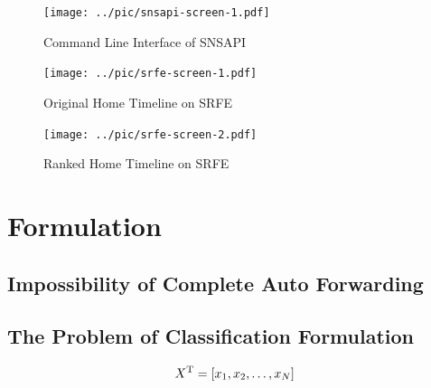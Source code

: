 \documentclass{sig-alternate}
\begin{document}
\begin{figure}[t!]
	\centering
	\texttt{[image: ../pic/snsapi-screen-1.pdf]}
	\caption{Command Line Interface of SNSAPI}
	\label{fig:snscli}
\end{figure}

\begin{figure}[t!]
	\centering
	\texttt{[image: ../pic/srfe-screen-1.pdf]}
	\caption{Original Home Timeline on SRFE}
\end{figure}

\begin{figure}[t!]
	\centering
	\texttt{[image: ../pic/srfe-screen-2.pdf]}
	\caption{Ranked Home Timeline on SRFE}
\end{figure}

%
%
%


\section{Formulation}
\label{sec:Formulation}

\subsection{Impossibility of Complete Auto Forwarding}
\label{sec:Impossibility of Complete Auto Forwarding}

\subsection{The Problem of Classification Formulation}
\label{sec:The Problem of Classification}

\begin{equation}
	X^\mathrm{T} = [x_1, x_2, \ldots, x_N]
\end{equation}
\end{document}
